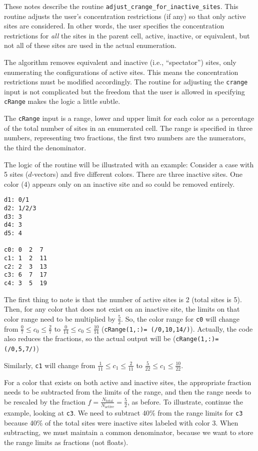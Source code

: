 \documentclass[12pt]{article}
\begin{document}
These notes describe the routine \verb=adjust_crange_for_inactive_sites=. This routine adjusts the user's concentration restrictions (if any) so that only active sites are considered. In other words, the user specifies the concentration restrictions for \emph{all} the sites in the parent cell, active, inactive, or equivalent, but not all of these sites are used in the actual enumeration.

The algorithm removes equivalent and inactive (i.e., ``spectator'') sites, only enumerating the configurations of active sites. This means the concentration restrictions must be modified accordingly. The routine for adjusting the \verb=crange= input is not complicated but the freedom that the user is allowed in specifying \verb=cRange= makes the logic a little subtle.

The \verb=cRange= input is a range, lower and upper limit for each color as a percentage of the total number of sites in an enumerated cell. The range is specified in three numbers, representing two fractions, the first two numbers are the numerators, the third the denominator.

The logic of the routine will be illustrated with an example: Consider a case with 5 sites ($d$-vectors) and five different colors. There are three inactive sites. One color (4) appears only on an inactive site and so could be removed entirely.
\begin{verbatim}
d1: 0/1
d2: 1/2/3
d3: 3
d4: 3
d5: 4

c0: 0  2  7
c1: 1  2  11
c2: 2  3  13
c3: 6  7  17
c4: 3  5  19
\end{verbatim}

The first thing to note is that the number of active sites is 2 (total sites is 5). Then, for any color that does not exist on an inactive site, the limits on that color range need to be multiplied by $\frac{5}{2}$. So, the color range for \verb=c0= will change from $\frac{0}{7}\leq c_0\leq \frac{2}{7}$ to $\frac{0}{14}\leq c_0\leq\frac{10}{14}$ (\verb&cRange(1,:)= (/0,10,14/)&). Actually, the code also reduces the fractions, so the actual output will be (\verb&cRange(1,:)= (/0,5,7/)&)

 Similarly, \verb=c1= will change from $\frac{1}{11}\leq c_1\leq\frac{2}{11}$ to $\frac{5}{22}\leq c_1\leq\frac{10}{22}$.

For a color that exists on both active and inactive sites, the appropriate fraction needs to be subtracted from the limits of the range, and then the range needs to be rescaled by the fraction $f=\frac{N_\mathrm{total}}{N_\mathrm{active}}=\frac{5}{2}$, as before. To illustrate, continue the example, looking at \verb=c3=. We need to subtract 40\% from the range limits for \verb=c3= because
40\% of the total sites were inactive sites labeled with color 3. When subtracting, we must maintain a common denominator, because we want to store the range limits as fractions (not floats).
\end{document}
